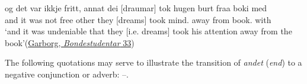 \ea \label{ex:07-85}
\gll og det var ikkje fritt, annat dei [draumar] tok hugen burt fraa boki med\\ %
 and it was not free other they [dreams] took mind.\DEF{} away from book.\DEF{} with\\
\glt `and it was undeniable that they [i.e. dreams] took his attention away from the book'\hfill(\href{https://archive.org/details/bondestudentar00garborgnb/page/n39/mode/2up?q=%22var+ikkje+fritt%2C+annat%22&view=theater}{Garborg, \textit{Bondestudentar} 33}) %
\z

The following quotations may serve to illustrate the transition of \textit{andet} (\textit{end}) to a negative conjunction or adverb: --.

